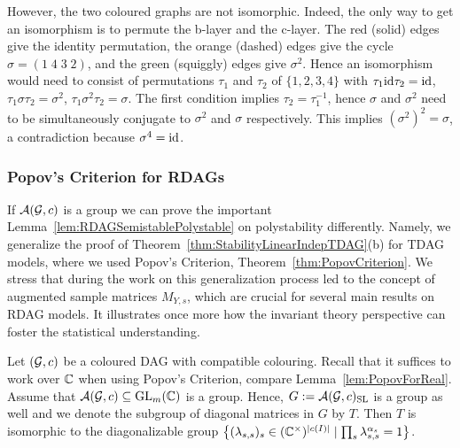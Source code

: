 \begin{example}
	However, the two coloured graphs are not isomorphic. Indeed, the only way to get an isomorphism is to permute the b-layer and the c-layer. The red (solid) edges give the identity permutation, the orange (dashed) edges give the cycle $\sigma = (1 \; 4 \; 3 \; 2)$, and the green (squiggly) edges give $\sigma^2$. Hence an isomorphism would need to consist of permutations $\tau_1$ and $\tau_2$ of $\{1,2,3,4\}$ with $\tau_1 {\rm id} \tau_2 = {\rm id}$, $\tau_1 \sigma \tau_2 = \sigma^2$, $\tau_1 \sigma^2 \tau_2 = \sigma$. The first condition implies $\tau_2 = \tau_1^{-1}$, hence $\sigma$ and $\sigma^2$ need to be simultaneously conjugate to $\sigma^2$ and $\sigma$ respectively. This implies $(\sigma^2)^2 = \sigma$, a contradiction because $\sigma^4 = {\rm id}$.
	\hfill\exSymbol
\end{example}


\subsubsection{Popov's Criterion for RDAGs} \label{subsec:RDAGpopov} 

If $\mathcal{A}(\mathcal{G}, c)$ is a group we can prove the important Lemma~\ref{lem:RDAGSemistablePolystable} on polystability differently. Namely, we generalize the proof of Theorem~\ref{thm:StabilityLinearIndepTDAG}(b) for TDAG models, where we used Popov's Criterion, Theorem~\ref{thm:PopovCriterion}. We stress that during the work on \cite{RDAG} this generalization process led to the concept of augmented sample matrices $M_{Y,s}$, which are crucial for several main results on RDAG models. It illustrates once more how the invariant theory perspective can foster the statistical understanding.

\medskip

Let $(\mathcal{G}, c)$ be a coloured DAG with compatible colouring. Recall that it suffices to work over $\mathbb C$ when using Popov's Criterion, compare Lemma~\ref{lem:PopovForReal}. Assume that $\mathcal{A}(\mathcal{G}, c) \subseteq \operatorname{GL}_m(\mathbb C)$ is a group. Hence, $G := \mathcal{A}(\mathcal{G}, c)_{\operatorname{SL}}$ is a group as well and we denote the subgroup of diagonal matrices in $G$ by $T$. Then $T$ is isomorphic to the diagonalizable group $\big\{ (\lambda_{s,s})_s \in (\mathbb C^\times)^{|c(I)|} \mid \prod_s \lambda_{s,s}^{\alpha_s} = 1 \big\}$.

